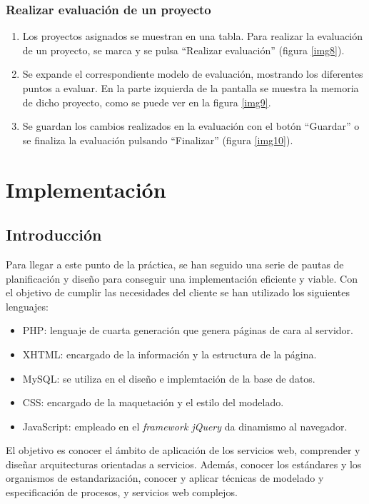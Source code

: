 \documentclass[12pt,a4paper,titlepage,spanish,twoside]{book}
\begin{document}
\subsection{Realizar evaluación de un proyecto}
\begin{enumerate}
\item Los proyectos asignados se muestran en una tabla. Para realizar la 
  evaluación de un proyecto, se marca y se pulsa ``Realizar evaluación''
  (figura \ref{img8}). 


\item Se expande el correspondiente modelo de evaluación, mostrando los 
  diferentes puntos a evaluar. En la parte izquierda de la pantalla se
  muestra la memoria de dicho proyecto, como se puede ver en la figura
  \ref{img9}. 


\item Se guardan los cambios realizados en la evaluación con el botón 
  ``Guardar'' o se finaliza la evaluación pulsando ``Finalizar'' (figura 
  \ref{img10}).
  
\end{enumerate}

\chapter{Implementación}
\section{Introducción}
Para llegar a este punto de la práctica, se han seguido una serie de pautas de
planificación y diseño para conseguir una implementación eficiente y viable.
Con el objetivo de cumplir las necesidades del cliente se han utilizado los
siguientes lenguajes:
\begin{itemize}
\item PHP\cite{achour}: lenguaje de cuarta generación que genera páginas de cara
al servidor.
\item XHTML\cite{wc}: encargado de la información y la estructura de la página.
\item MySQL: se utiliza en el diseño e implemtación de la base de datos.
\item CSS\cite{wc}: encargado de la maquetación y el estilo del modelado.
\item JavaScript\cite{resig}: empleado en el \emph{framework jQuery} da 
dinamismo al navegador.
\end{itemize} 
El objetivo es conocer el ámbito de aplicación de los servicios web, comprender 
y diseñar arquitecturas orientadas a servicios. Además, conocer los estándares y
los organismos de estandarización, conocer y aplicar técnicas de modelado y 
especificación de procesos, y servicios web complejos.
\end{document}
